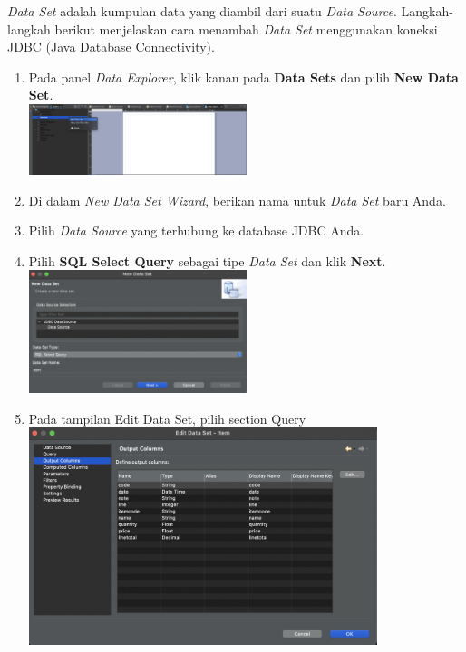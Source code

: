 \textit{Data Set} adalah kumpulan data yang diambil dari suatu \textit{Data Source}. Langkah-langkah berikut menjelaskan cara menambah \textit{Data Set} menggunakan koneksi JDBC (Java Database Connectivity).

\begin{enumerate}
	\item Pada panel \textit{Data Explorer}, klik kanan pada \textbf{Data Sets} dan pilih \textbf{New Data Set}. \\
	\includegraphics[width=0.5\textwidth]{assets/pertemuan14/Data-Set/birt-pre-new-data-set.png}
	
	\item Di dalam \textit{New Data Set Wizard}, berikan nama untuk \textit{Data Set} baru Anda.
	
	\item Pilih \textit{Data Source} yang terhubung ke database JDBC Anda.
	
	\item Pilih \textbf{SQL Select Query} sebagai tipe \textit{Data Set} dan klik \textbf{Next}. \\
	\includegraphics[width=0.5\textwidth]{assets/pertemuan14/Data-Set/birt-new-data-set.png}
	
	
	\item Pada tampilan Edit Data Set, pilih section Query \\
	\includegraphics[width=0.8\textwidth]{assets/pertemuan14/Data-Set/birt-edit-data-set.png}
	

\end{enumerate}
